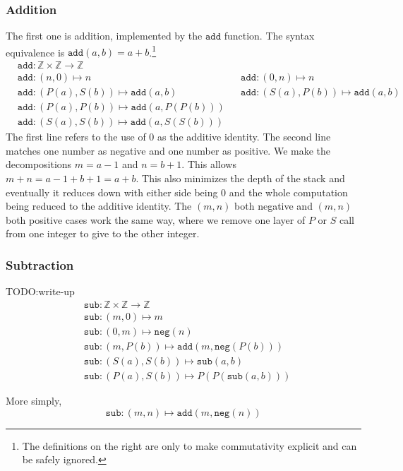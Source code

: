 \documentclass{article}
\newcommand{\Z}{\mathbb{Z}}
\newcommand{\ttneg}{\mathtt{neg}}
\newcommand{\ttadd}{\mathtt{add}}
\newcommand{\ttsub}{\mathtt{sub}}
\begin{document}
\subsubsection*{Addition}
The first one is addition, implemented by the $\ttadd$ function. The syntax equivalence is $\ttadd(a, b) = a + b$.\footnote{The definitions on the right are only to make commutativity explicit and can be safely ignored.}
\begin{align*}
&{} \ttadd : \Z \times \Z \to \Z \\
&{} \ttadd : (n, 0) \mapsto n &
&{} \ttadd : (0, n) \mapsto n \\
&{} \ttadd : (P(a), S(b)) \mapsto \ttadd(a, b) &
&{} \ttadd : (S(a), P(b)) \mapsto \ttadd(a, b) \\
&{} \ttadd : (P(a), P(b)) \mapsto \ttadd(a, P(P(b))) \\
&{} \ttadd : (S(a), S(b)) \mapsto \ttadd(a, S(S(b)))
\end{align*}
The first line refers to the use of 0 as the additive identity. The second line matches one number as negative and one number as positive.   We make the decompositions $m = a - 1$ and $n = b + 1$. This allows $m + n = a - 1 + b + 1 = a + b$. This also minimizes the depth of the stack and eventually it reduces down with either side being 0 and the whole computation being reduced to the additive identity. The $(m, n)$ both negative and $(m, n)$ both positive cases work the same way, where we remove one layer of $P$ or $S$ call from one integer to give to the other integer.

\subsubsection*{Subtraction}
TODO:\@{}write-up
\begin{align*}
&{} \ttsub : \Z \times \Z \to \Z \\
&{} \ttsub : (m, 0) \mapsto m \\
&{} \ttsub : (0, m) \mapsto \ttneg(n) \\
&{} \ttsub : (m, P(b)) \mapsto \ttadd(m, \ttneg(P(b))) \\
&{} \ttsub : (S(a), S(b)) \mapsto \ttsub(a, b) \\
&{} \ttsub : (P(a), S(b)) \mapsto P(P(\ttsub(a, b)))
\end{align*}

More simply,
\[ \ttsub : (m, n) \mapsto \ttadd(m, \ttneg(n)) \]
\end{document}
